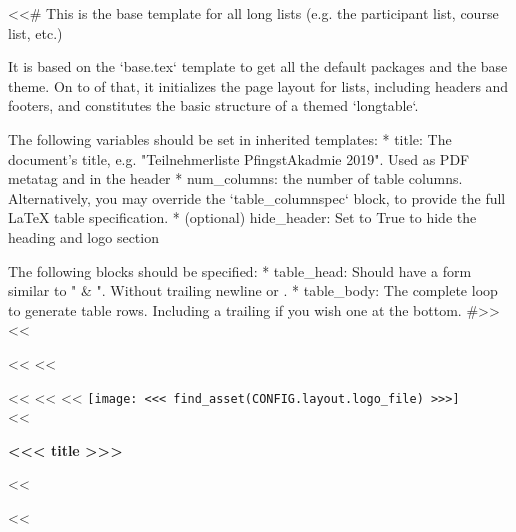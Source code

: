 <<# This is the base template for all long lists (e.g. the participant list, course list, etc.)

    It is based on the `base.tex` template to get all the default packages and the base theme. On to of that, it
    initializes the page layout for lists, including headers and footers, and constitutes the basic structure of a
    themed `longtable`.

    The following variables should be set in inherited templates:
      * title: The document's title, e.g. "Teilnehmerliste PfingstAkadmie 2019". Used as PDF metatag and in the header
      * num_columns: the number of table columns. Alternatively, you may override the `table_columnspec` block, to
        provide the full LaTeX table specification.
      * (optional) hide_header: Set to True to hide the heading and logo section

    The following blocks should be specified:
      * table_head: Should have a form similar to " & ". Without trailing newline
        or \hline.
      * table_body: The complete loop to generate table rows. Including a trailing \hline if you wish one at the bottom.
#>>
<<%

<<%
    \cfoot[]{}
<<%

<<%
    <<%
        \thispagestyle{plain}
        <<%
            \hspace*{\fill}\texttt{[image: <<< find\_asset(CONFIG.layout.logo\_file) >>>]}\\

            \vspace{-2cm}
        <<%
        \begin{center}
            \headingfamily\bfseries\huge{}<<< title >>>
        \end{center}
    <<%

<<%
